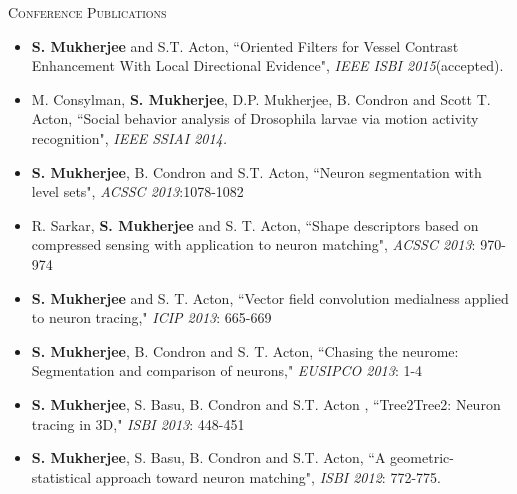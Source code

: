 \noindent \textsc{Conference Publications}
\begin{itemize}
\item
\textbf{S. Mukherjee} and S.T. Acton, ``Oriented Filters for Vessel Contrast Enhancement With Local Directional Evidence", \textit{IEEE ISBI 2015}(accepted).
\item
M. Consylman, \textbf{S. Mukherjee}, D.P. Mukherjee, B. Condron and Scott T. Acton, ``Social behavior analysis of Drosophila larvae via motion activity recognition", \textit{IEEE SSIAI 2014.}
\item
\textbf{S. Mukherjee}, B. Condron and S.T. Acton, ``Neuron segmentation with level sets", \textit{ACSSC 2013}:1078-1082
\item
R. Sarkar, \textbf{S. Mukherjee} and S. T. Acton, ``Shape descriptors based on compressed sensing with application to neuron matching", \textit{ACSSC 2013}: 970-974
\item
\textbf{S. Mukherjee} and S. T. Acton, ``Vector field convolution medialness applied to neuron tracing," \textit{ICIP 2013}: 665-669
\item
\textbf{S. Mukherjee}, B. Condron and S. T. Acton, ``Chasing the neurome: Segmentation and comparison of neurons," \textit{EUSIPCO 2013}: 1-4
\item
\textbf{S. Mukherjee}, S. Basu, B. Condron and S.T. Acton , ``Tree2Tree2: Neuron tracing in 3D," \textit{ISBI 2013}: 448-451
\item
\textbf{S. Mukherjee}, S. Basu, B. Condron and S.T. Acton, ``A geometric-statistical approach toward neuron matching", \textit{ISBI 2012}: 772-775.

\end{itemize}

